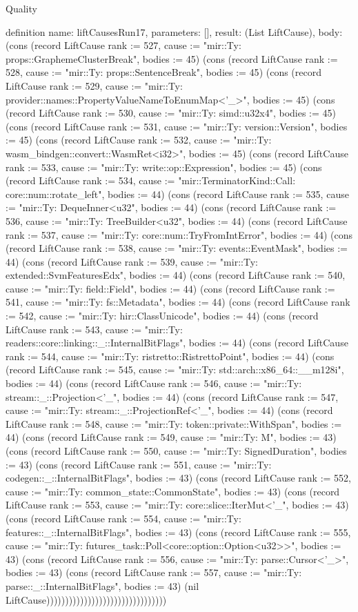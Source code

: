 \begin{lexlean}{Quality}
\begin{semanticmodule}
definition{
  name: liftCausesRun17,
  parameters: [],
  result: (List LiftCause),
  body: (cons (record LiftCause {rank := 527, cause := "mir::Ty: props::GraphemeClusterBreak", bodies := 45}) (cons (record LiftCause {rank := 528, cause := "mir::Ty: props::SentenceBreak", bodies := 45}) (cons (record LiftCause {rank := 529, cause := "mir::Ty: provider::names::PropertyValueNameToEnumMap<'_>", bodies := 45}) (cons (record LiftCause {rank := 530, cause := "mir::Ty: simd::u32x4", bodies := 45}) (cons (record LiftCause {rank := 531, cause := "mir::Ty: version::Version", bodies := 45}) (cons (record LiftCause {rank := 532, cause := "mir::Ty: wasm_bindgen::convert::WasmRet<i32>", bodies := 45}) (cons (record LiftCause {rank := 533, cause := "mir::Ty: write::op::Expression", bodies := 45}) (cons (record LiftCause {rank := 534, cause := "mir::TerminatorKind::Call: core::num::rotate_left", bodies := 44}) (cons (record LiftCause {rank := 535, cause := "mir::Ty: DequeInner<u32", bodies := 44}) (cons (record LiftCause {rank := 536, cause := "mir::Ty: TreeBuilder<u32", bodies := 44}) (cons (record LiftCause {rank := 537, cause := "mir::Ty: core::num::TryFromIntError", bodies := 44}) (cons (record LiftCause {rank := 538, cause := "mir::Ty: events::EventMask", bodies := 44}) (cons (record LiftCause {rank := 539, cause := "mir::Ty: extended::SvmFeaturesEdx", bodies := 44}) (cons (record LiftCause {rank := 540, cause := "mir::Ty: field::Field", bodies := 44}) (cons (record LiftCause {rank := 541, cause := "mir::Ty: fs::Metadata", bodies := 44}) (cons (record LiftCause {rank := 542, cause := "mir::Ty: hir::ClassUnicode", bodies := 44}) (cons (record LiftCause {rank := 543, cause := "mir::Ty: readers::core::linking::_::InternalBitFlags", bodies := 44}) (cons (record LiftCause {rank := 544, cause := "mir::Ty: ristretto::RistrettoPoint", bodies := 44}) (cons (record LiftCause {rank := 545, cause := "mir::Ty: std::arch::x86_64::__m128i", bodies := 44}) (cons (record LiftCause {rank := 546, cause := "mir::Ty: stream::_::Projection<'_", bodies := 44}) (cons (record LiftCause {rank := 547, cause := "mir::Ty: stream::_::ProjectionRef<'_", bodies := 44}) (cons (record LiftCause {rank := 548, cause := "mir::Ty: token::private::WithSpan", bodies := 44}) (cons (record LiftCause {rank := 549, cause := "mir::Ty: M", bodies := 43}) (cons (record LiftCause {rank := 550, cause := "mir::Ty: SignedDuration", bodies := 43}) (cons (record LiftCause {rank := 551, cause := "mir::Ty: codegen::_::InternalBitFlags", bodies := 43}) (cons (record LiftCause {rank := 552, cause := "mir::Ty: common_state::CommonState", bodies := 43}) (cons (record LiftCause {rank := 553, cause := "mir::Ty: core::slice::IterMut<'_", bodies := 43}) (cons (record LiftCause {rank := 554, cause := "mir::Ty: features::_::InternalBitFlags", bodies := 43}) (cons (record LiftCause {rank := 555, cause := "mir::Ty: futures_task::Poll<core::option::Option<u32>>", bodies := 43}) (cons (record LiftCause {rank := 556, cause := "mir::Ty: parse::Cursor<'_>", bodies := 43}) (cons (record LiftCause {rank := 557, cause := "mir::Ty: parse::_::InternalBitFlags", bodies := 43}) (nil LiftCause))))))))))))))))))))))))))))))))
}


\end{semanticmodule}
\end{lexlean}
